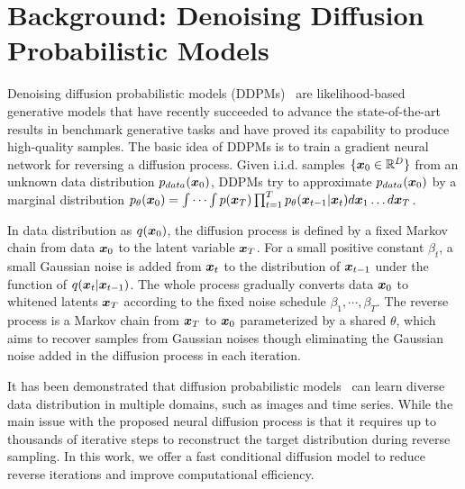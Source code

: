 

  \section{Background: Denoising Diffusion Probabilistic Models}
  Denoising diffusion probabilistic models (DDPMs)~\cite{ho2020denoising,song2020denoising,lam2022bddm} are likelihood-based generative models that have recently succeeded to advance the state-of-the-art results in benchmark generative tasks \cite{dhariwal2021diffusion} and have proved its capability to produce high-quality samples. The basic idea of DDPMs is to train a gradient neural network for reversing a diffusion process. Given i.i.d. samples $\{{\bm{x}}_{0} \in \mathbb{R}^{D}\}$ from an unknown data distribution $p_{data}({\bm{x}}_{0})$, DDPMs try to approximate $p_{data}({\bm{x}}_{0})$ by a marginal distribution $p_{\theta}({\bm{x}}_{0})=\int\cdots\int p({\bm{x}}_T)\prod_{t=1}^{T} p_{\theta}({\bm{x}}_{t-1}|{\bm{x}}_{t}) d {\bm{x}}_1 \ldots d{\bm{x}}_T$.
  
  In data distribution as $q({\bm{x}}_{0})$, the diffusion process is defined by a fixed Markov chain from data ${\bm{x}}_0$ to the latent variable ${\bm{x}}_T$. 
For a small positive constant $\beta_t$, a small Gaussian noise is added from ${\bm{x}}_{t}$ to the distribution of ${\bm{x}}_{t-1}$ under the function of $q({\bm{x}}_t|{\bm{x}}_{t-1})$. The whole process gradually converts data ${\bm{x}}_0$ to whitened latents ${\bm{x}}_T$ according to the fixed noise schedule $\beta_1,\cdots,\beta_T$. 
  The reverse process is a Markov chain from ${\bm{x}}_T$ to ${\bm{x}}_0$ parameterized by a shared $\theta$, which aims to recover samples from Gaussian noises though eliminating the Gaussian noise added in the diffusion process in each iteration.
  
  It has been demonstrated that diffusion probabilistic models~\cite{dhariwal2021diffusion,xiao2021tackling} can learn diverse data distribution in multiple domains, such as images and time series. While the main issue with the proposed neural diffusion process is that it requires up to thousands of iterative steps to reconstruct the target distribution during reverse sampling. In this work, we offer a fast conditional diffusion model to reduce reverse iterations and improve computational efficiency. 